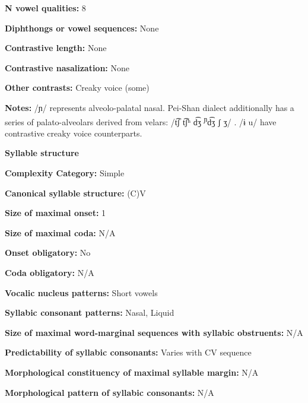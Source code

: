 \textbf{N vowel qualities:} 8



\textbf{Diphthongs or vowel sequences:} None



\textbf{Contrastive length:} None



\textbf{Contrastive nasalization:} None



\textbf{Other contrasts:} Creaky voice (some)



\textbf{Notes:} /ɲ/ represents alveolo-palatal nasal. Pei-Shan dialect additionally has a series of palato-alveolars derived from velars: /t͡ʃ t͡ʃʰ d͡ʒ \textsuperscript{ɲ}d͡ʒ ʃ ʒ/ \citep[68-9]{Maoji1997}. /ɨ u/ have contrastive creaky voice counterparts.



\textbf{Syllable structure}



\textbf{Complexity Category:} Simple



\textbf{Canonical syllable structure:} (C)V \citep[30-2]{Gerner2013}



\textbf{Size of maximal onset:} 1



\textbf{Size of maximal coda:} N/A



\textbf{Onset obligatory:} No



\textbf{Coda obligatory:} N/A



\textbf{Vocalic nucleus patterns:} Short vowels



\textbf{Syllabic consonant patterns:} Nasal, Liquid



\textbf{Size of maximal word{}-marginal sequences with syllabic obstruents:} N/A



\textbf{Predictability of syllabic consonants:} Varies with CV sequence



\textbf{Morphological constituency of maximal syllable margin:} N/A



\textbf{Morphological pattern of syllabic consonants:} N/A



